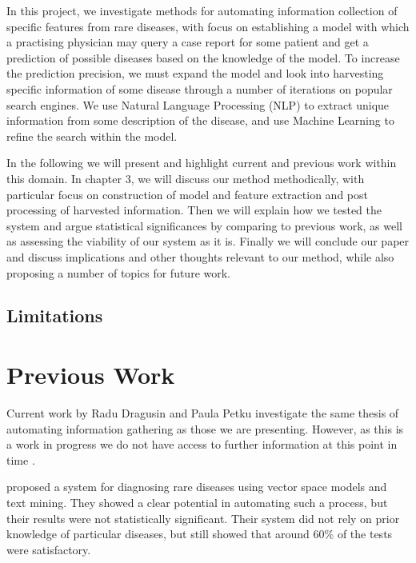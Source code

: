 \documentclass[10pt,letterpaper,final]{article}
\begin{document}
In this project, we investigate methods for automating information
collection of specific features from rare diseases, with focus on
establishing a model with which a practising physician may query a case
report for some patient and get a prediction of possible diseases based
on the knowledge of the model.
To increase the prediction precision, we must expand the model and look
into harvesting specific information of some disease through a number of
iterations on popular search engines. We use Natural Language Processing
(NLP) to extract unique information from some description of the
disease, and use Machine Learning to refine the search within the model.


In the following we will present and highlight current and previous work
within this domain. In chapter 3, we will discuss our method
methodically, with particular focus on construction of model and feature
extraction and post processing of harvested information.
Then we will explain how we tested the system and argue statistical
significances by comparing to previous work, as well as assessing the
viability of our system as it is.
Finally we will conclude our paper and discuss implications and other
thoughts relevant to our method, while also proposing a number of topics
for future work.

\subsection{Limitations}

\section{Previous Work}
Current work by Radu Dragusin and Paula Petku investigate the same
thesis of automating information gathering as those we are presenting.
However, as this is a work in progress we do not have access to further
information at this point in time \cite{radupaula}.

\cite{jensenandersen} proposed a system for diagnosing rare diseases
using vector space models and text mining. They showed a clear potential
in automating such a process, but their results were not statistically
significant. Their system did not rely on prior knowledge of particular
diseases, but still showed that around 60\% of the tests were
satisfactory.
\end{document}
